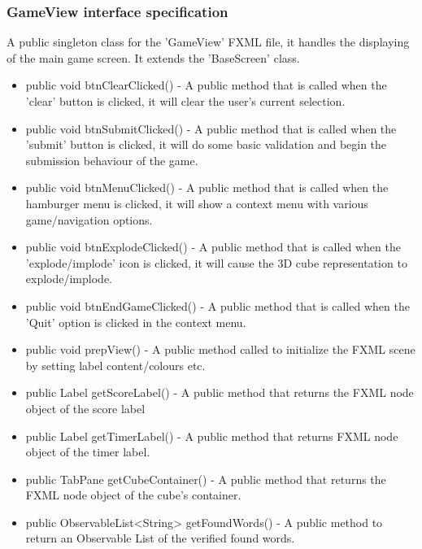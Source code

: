         \subsubsection{GameView interface specification}
        	A public singleton class for the 'GameView' FXML file, it handles the displaying of the main game screen. It extends the 'BaseScreen' class.
            \begin{itemize}
            	\item public void btnClearClicked() - A public method that is called when the 'clear' button is clicked, it will clear the user's current selection.
                \item public void btnSubmitClicked() - A public method that is called when the 'submit' button is clicked, it will do some basic validation and begin the submission behaviour of the game.
                \item public void btnMenuClicked() - A public method that is called when the hamburger menu is clicked, it will show a context menu with various game/navigation options.
                \item public void btnExplodeClicked() - A public method that is called when the 'explode/implode' icon is clicked, it will cause the 3D cube representation to explode/implode.
                \item public void btnEndGameClicked() - A public method that is called when the 'Quit' option is clicked in the context menu.
                \item public void prepView() - A public method called to initialize the FXML scene by setting label content/colours etc.
                \item public Label getScoreLabel() - A public method that returns the FXML node object of the score label
                \item public Label getTimerLabel() - A public method that returns FXML node object of the timer label.
                \item public TabPane getCubeContainer() - A public method that returns the FXML node object of the cube's container.
                \item public ObservableList<String> getFoundWords() - A public method to return an Observable List of the verified found words.
            \end{itemize}

